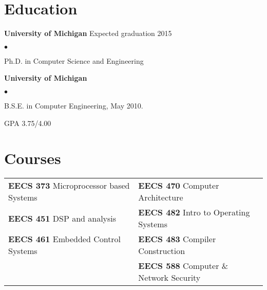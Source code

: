 \documentclass{res}
\newcommand{\sqitem}{\item[\tiny$\blacksquare$]}
\newcommand{\sqlist}{\begin{list}{$\bullet$}
  { \setlength{\itemsep}{0pt}
	\setlength{\parsep}{0pt}
	\setlength{\topsep}{0pt}
	\setlength{\partopsep}{0pt}
	\setlength{\leftmargin}{6.0em}
	\setlength{\labelsep}{2.5em} } }
\newcommand{\sqend}{\end{list}}
\begin{document}

\address{\emph{Current Address}	\\
			1929 Plymouth Rd Apt 3024	\\
			Ann Arbor, MI 48105			\\
										\\
			phone: 734.330.8702			\\
			email: ewust@umich.edu}
\address{\emph{Permanent Address}	\\
			13768 Howen Dr				\\
			Saratoga, CA 95070}

\begin{resume}




\section{Education}
	\textbf{University of Michigan}  Expected graduation 2015%
	\sqlist	
		\sqitem Ph.D. in Computer Science and Engineering 
	\sqend

	\textbf{University of Michigan}
	\sqlist
		\sqitem B.S.E. in Computer Engineering, May 2010.
		\sqitem GPA 3.75/4.00
	\sqend

\section{Courses}
	\begin{tabular}{l l}
	\textbf{EECS 373} Microprocessor based Systems & 
					\textbf{EECS 470} Computer Architecture \\
	\textbf{EECS 451} DSP and analysis & 
					\textbf{EECS 482} Intro to Operating Systems \\
	\textbf{EECS 461} Embedded Control Systems & 
					\textbf{EECS 483} Compiler Construction \\
											  &
					\textbf{EECS 588} Computer \& Network Security \\
	\end{tabular}


\end{resume}
\end{document}
